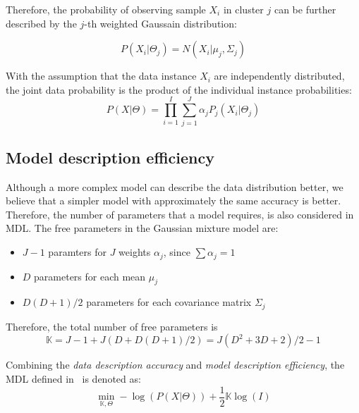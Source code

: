 Therefore, the probability of observing sample $X_i$ in cluster $j$ can be further described by the $j$-th weighted Gaussain distribution:

\begin{equation}
P(X_i|\Theta_j) = N(X_i | \mu_j, \Sigma_j)
\end{equation}

With the assumption that the data instance $X_i$ are independently distributed, 
the joint data probability is the product of the individual instance probabilities:
\begin{equation}
P(X|\Theta) = \prod_{i=1}^{I} \sum_{j=1}^{J} \alpha_j P_j(X_i | \Theta_j)
\end{equation}



\subsection{Model description efficiency}
Although a more complex model can describe the data distribution better, 
we believe that a simpler model with approximately the same accuracy is better.
Therefore, the number of parameters that a model requires, is also considered in MDL.
The free parameters in the Gaussian mixture model are:
\begin{itemize}
\item $J-1$ paramters for $J$ weights $\alpha_j$, since $\sum \alpha_j = 1$
\item $D$ parameters for each mean $\mu_j$
\item $D(D+1)/2$ parameters for each covariance matrix $\Sigma_j$
\end{itemize}

Therefore, the total number of free parameters is
\begin{equation}
\mathbb{K} = J - 1 + J(D + D(D+1)/2) = J(D^2 + 3D + 2)/2 -1
\end{equation}


Combining the \textit{data description accuracy} and \textit{model description efficiency}, 
the MDL defined in~\cite{Rissanen:1984:Universal} is denoted as:
\begin{equation}
\min_{\mathbb{K}, \Theta} - \log (P(X|\Theta)) + \frac{1}{2}\mathbb{K}\log(I)
\end{equation}\label{equation:MDL}


